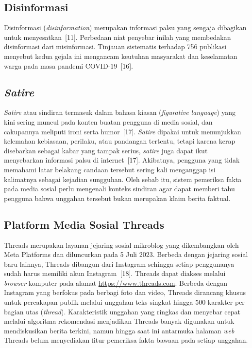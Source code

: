 \documentclass[12pt,a4paper,twoside]{report}
\begin{document}
\subsection{Disinformasi}

Disinformasi (\textit{disinformation}) merupakan informasi palsu yang sengaja dibagikan untuk menyesatkan~[11]. Perbedaan niat penyebar inilah yang membedakan disinformasi dari misinformasi. Tinjauan sistematis terhadap 756 publikasi menyebut kedua gejala ini mengancam keutuhan masyarakat dan keselamatan warga pada masa pandemi COVID-19~[16].

\subsection{\textit{Satire}}

\textit{Satire} atau sindiran termasuk dalam bahasa kiasan (\textit{figurative language}) yang kini sering muncul pada konten buatan pengguna di media sosial, dan cakupannya meliputi ironi serta humor~[17]. \textit{Satire} dipakai untuk menunjukkan kelemahan kebiasaan, perilaku, atau pandangan tertentu, tetapi karena kerap disebarkan sebagai kabar yang tampak serius, \textit{satire} juga dapat ikut menyebarkan informasi palsu di internet~[17]. Akibatnya, pengguna yang tidak memahami latar belakang candaan tersebut sering kali menganggap isi kalimatnya sebagai kejadian sungguhan. Oleh sebab itu, sistem pemeriksa fakta pada media sosial perlu mengenali konteks sindiran agar dapat memberi tahu pengguna bahwa unggahan tersebut bukan merupakan klaim berita faktual.

\subsection{Platform Media Sosial Threads}

Threads merupakan layanan jejaring sosial mikroblog yang dikembangkan oleh Meta Platforms dan diluncurkan pada 5 Juli 2023. Berbeda dengan jejaring sosial baru lainnya, Threads dibangun dari Instagram sehingga setiap penggunanya sudah harus memiliki akun Instagram~[18]. Threads dapat diakses melalui \textit{browser} komputer pada alamat \url{https://www.threads.com}. Berbeda dengan Instagram yang berfokus pada berbagi foto dan video, Threads dirancang khusus untuk percakapan publik melalui unggahan teks singkat hingga 500 karakter per bagian utas (\textit{thread}). Karakteristik unggahan yang ringkas dan menyebar cepat melalui algoritma rekomendasi menjadikan Threads banyak digunakan untuk mendiskusikan berita terkini, namun hingga saat ini antarmuka halaman \textit{web} Threads belum menyediakan fitur pemeriksa fakta bawaan pada setiap unggahan.
\end{document}
